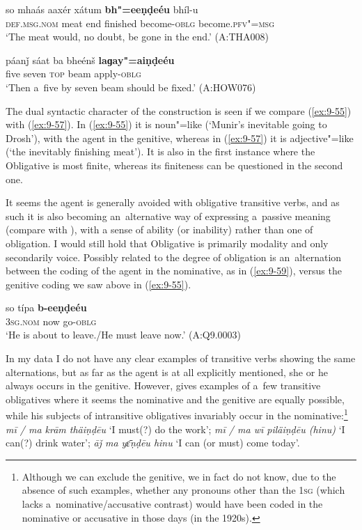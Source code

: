 \begin{exe}
\ex
\label{ex:9-57}
\gll so mhaás aaxér xátum \textbf{bh"=eeṇḍeéu} bhíl-u \\
\textsc{def.msg.nom} meat end finished become-\textsc{oblg} become.\textsc{pfv"=msg}  \\
\glt `The meat would, no doubt, be gone in the end.' (A:THA008)

\ex
\label{ex:9-58}
\gll páanǰ sáat ba bheénš \textbf{laɡay"=aiṇḍeéu} \\
five seven \textsc{top} beam apply-\textsc{oblg} \\
\glt `Then a~five by seven beam should be fixed.' (A:HOW076)
\end{exe}

The dual syntactic character of the construction is seen if we compare (\ref{ex:9-55}) with (\ref{ex:9-57}). In (\ref{ex:9-55}) it is noun"=like (`Munir's inevitable going to Drosh'), with the agent in the genitive, whereas in (\ref{ex:9-57}) it is adjective"=like (`the inevitably finishing meat'). It is also in the first instance where the Obligative is most finite, whereas its finiteness can be questioned in the second one.


It seems the agent is generally avoided with obligative transitive verbs, and as such it is also becoming an~alternative way of expressing a~passive meaning (compare with ), with a sense of ability (or inability) rather than one of obligation. I would still hold that Obligative is primarily modality and only secondarily voice. Possibly related to the degree of obligation is an~alternation between the coding of the agent in the nominative, as in (\ref{ex:9-59}), versus the genitive coding we saw above in (\ref{ex:9-55}).

\begin{exe}
\ex
\label{ex:9-59}
\gll so típa \textbf{b-eeṇḍeéu} \\
\textsc{3sg.nom} now go-\textsc{oblg} \\
\glt `He is about to leave./He must leave now.' (A:Q9.0003)
\end{exe}

In my data I do not have any clear examples of transitive verbs showing the same alternations, but as far as the agent is at all explicitly mentioned, she or he always occurs in the genitive. However, \citet[24]{morgenstierne1941} gives examples of a~few transitive obligatives where it seems the nominative and the genitive are equally possible, while his subjects of intransitive obligatives invariably occur in the nominative:\footnote{Although we can exclude the genitive, we in fact do not know, due to the absence of such examples, whether any pronouns other than the \textsc{1sg} (which lacks a~nominative/accusative contrast) would have been coded in the nominative or accusative in those days (in the 1920s).} \textit{mī / ma krām thäiṇḍēu} `I must(?) do the work'; \textit{mī / ma wī piläiṇḍēu (hinu)} `I can(?) drink water'; \textit{āǰ ma yɛ̄ṇḍēu hinu} `I can (or must) come today'.


